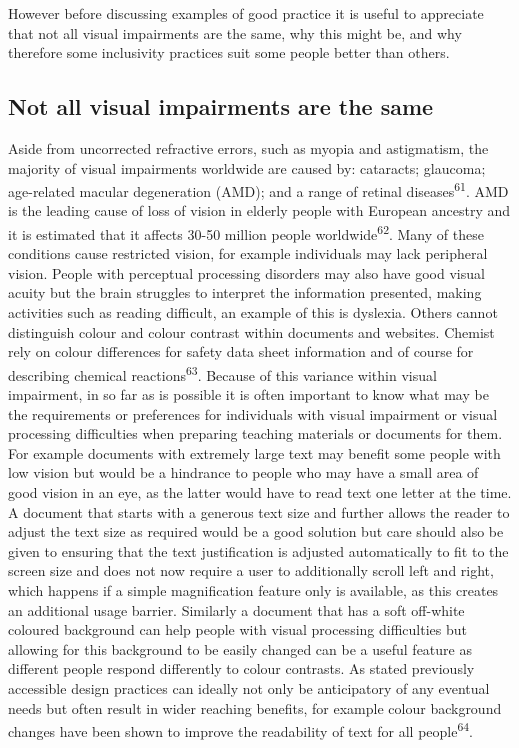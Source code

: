 \documentclass[11.5pt]{sig-alternate} %
\begin{document}
\begin{large}
However before discussing examples of good practice it is useful to appreciate that not all visual impairments are the same, why this might be, and why therefore some inclusivity practices suit some people better than others.

\subsection*{Not all visual impairments are the same}

Aside from uncorrected refractive errors, such as myopia and astigmatism, the majority of visual impairments worldwide are caused by: cataracts; glaucoma; age-related macular degeneration (AMD); and a range of retinal diseases\textsuperscript{61}. AMD is the leading cause of loss of vision in elderly people with European ancestry and it is estimated that it affects 30-50 million people worldwide\textsuperscript{62}.  Many of these conditions cause restricted vision, for example individuals may lack peripheral vision. People with perceptual processing disorders may also have good visual acuity but the brain struggles to interpret the information presented, making activities such as reading difficult, an example of this is dyslexia. Others cannot distinguish colour and colour contrast within documents and websites. Chemist rely on colour differences for safety data sheet information and of course for describing chemical reactions\textsuperscript{63}. Because of this variance within visual impairment, in so far as is possible it is often important to know what may be the requirements or preferences for individuals with visual impairment or visual processing difficulties when preparing teaching materials or documents for them.  For example documents with extremely large text may benefit some people with low vision but would be a hindrance to people who may have a small area of good vision in an eye, as the latter would have to read text one letter at the time. A document that starts with a generous text size and further allows the reader to adjust the text size as required would be a good solution but care should also be given to ensuring that the text justification is adjusted automatically to fit to the screen size and does not now require a user to additionally scroll left and right, which happens if a simple magnification feature only is available, as this creates an additional usage barrier. Similarly a document that has a soft off-white coloured background can help people with visual processing difficulties but allowing for this background to be easily changed can be a useful feature as different people respond differently to colour contrasts. As stated previously accessible design practices can ideally not only be anticipatory of any eventual needs but often result in wider reaching benefits, for example colour background changes have been shown to improve the readability of text for all people\textsuperscript{64}. 


\end{large}
\end{document}
